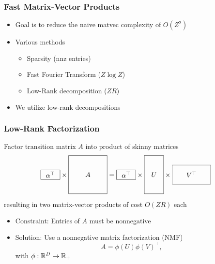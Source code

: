 \documentclass{beamer}
\begin{document}
\begin{frame}
\frametitle{Fast Matrix-Vector Products}
\begin{itemize}
\item Goal is to reduce the naive matvec complexity of $O(Z^2)$
\vspace{2em}
\item Various methods
    \vspace{1em}
    \begin{itemize}
    \item Sparsity (nnz entries)
    \vspace{1em}
    \item Fast Fourier Transform ($Z \log Z$)
    \vspace{1em}
    \item Low-Rank decomposition ($ZR$)
    \end{itemize}
\vspace{2em}
\item We utilize low-rank decompositions
\end{itemize}
\end{frame}

\begin{frame}
\frametitle{Low-Rank Factorization}
Factor transition matrix $A$ into product of skinny matrices
\[
\vcenter{\hbox{\begin{tikzpicture}[baseline=-0.5ex]
    \draw (0,0) rectangle (1,.5) node[pos=.5] {$\alpha^\top$};
\end{tikzpicture}}}
\times
\vcenter{\hbox{\begin{tikzpicture}[baseline=-0.5ex]
    \draw (0,0) rectangle (2,2) node[pos=.5] {$A$};
\end{tikzpicture}}}
=
\vcenter{\hbox{\begin{tikzpicture}[baseline=-0.5ex]
    \draw (0,0) rectangle (1,.5) node[pos=.5] {$\alpha^\top$};
\end{tikzpicture}}}
\times
\vcenter{\hbox{\begin{tikzpicture}[baseline=-0.5ex]
    \draw (0,0) rectangle (1,2) node[pos=.5] {$U$};
\end{tikzpicture}}}
\times 
\vcenter{\hbox{\begin{tikzpicture}[baseline=-0.5ex]
    \draw (0,0) rectangle (2,1) node[pos=.5] {$V^\top$};
\end{tikzpicture}}}
\]
resulting in two matrix-vector products of cost $O(ZR)$ each
\vspace{1em}
\begin{itemize}
\item Constraint: Entries of $A$ must be nonnegative
\vspace{1em}
\item Solution: Use a nonnegative matrix factorization (NMF)
$$A = \phi(U)\phi(V)^\top,$$
with $\phi:\mathbb{R}^D\to\mathbb{R}_+$
\end{itemize}
\end{frame}
\end{document}
